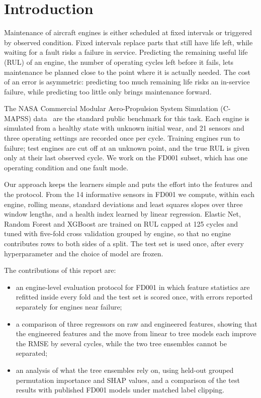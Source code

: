 \section{Introduction}
\label{sec:intro}

Maintenance of aircraft engines is either scheduled at fixed intervals or
triggered by observed condition. Fixed intervals replace parts that still
have life left, while waiting for a fault risks a failure in service.
Predicting the remaining useful life (RUL) of an engine, the number of
operating cycles left before it fails, lets maintenance be planned close to
the point where it is actually needed. The cost of an error is asymmetric:
predicting too much remaining life risks an in-service failure, while
predicting too little only brings maintenance forward.

The NASA Commercial Modular Aero-Propulsion System Simulation (C-MAPSS)
data~\cite{saxena2008damage} are the standard public benchmark for this
task. Each engine is simulated from a healthy state with unknown initial
wear, and 21 sensors and three operating settings are recorded once per
cycle. Training engines run to failure; test engines are cut off at an
unknown point, and the true RUL is given only at their last observed cycle.
We work on the FD001 subset, which has one operating condition and one
fault mode.

Our approach keeps the learners simple and puts the effort into the
features and the protocol. From the 14 informative sensors in FD001 we
compute, within each engine, rolling means, standard deviations and least
squares slopes over three window lengths, and a health index learned by
linear regression. Elastic Net, Random Forest and XGBoost are trained on
RUL capped at 125 cycles and tuned with five-fold cross validation grouped
by engine, so that no engine contributes rows to both sides of a split. The
test set is used once, after every hyperparameter and the choice of model
are frozen.

The contributions of this report are:
\begin{itemize}
\item an engine-level evaluation protocol for FD001 in which feature
statistics are refitted inside every fold and the test set is scored once,
with errors reported separately for engines near failure;
\item a comparison of three regressors on raw and engineered features,
showing that the engineered features and the move from linear to tree
models each improve the RMSE by several cycles, while the two tree
ensembles cannot be separated;
\item an analysis of what the tree ensembles rely on, using held-out
grouped permutation importance and SHAP values, and a comparison of the
test results with published FD001 models under matched label clipping.
\end{itemize}

